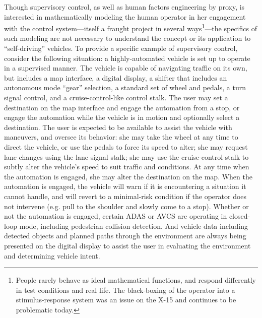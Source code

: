 Though supervisory control, as well as human factors engineering by proxy, is
interested in mathematically modeling the human operator in her
engagement with the control system---itself a fraught project in
several ways\footnote{People rarely behave as ideal mathematical
  functions, and respond differently in test conditions and real life.
  The black-boxing of the operator into a stimulus-response 
system was an issue on the X-15 \cite[p. 54]{DM} and continues to be
problematic today.}---the specifics of such modeling are not necessary to 
understand the concept or its application to ``self-driving'' vehicles. To provide
a specific example of supervisory control, consider the following
situation: a highly-automated vehicle is set up to operate in a
supervised manner. The vehicle is capable of navigating traffic on its
own, but includes a map interface, a digital display, a shifter that includes an
autonomous mode ``gear'' selection, a standard set of wheel and
pedals, a turn signal control,
and a cruise-control-like control stalk. The user may set a
destination on the map interface and engage the automation from a stop, or engage
the automation while the vehicle is in motion and optionally select a
destination. The user is expected to 
be available to assist the vehicle with maneuvers, and oversee its
behavior:  she may take the wheel at any time to direct the vehicle,
or use the pedals to force its speed to alter; she may request lane
changes using the lane signal stalk; she may use the cruise-control
stalk to subtly alter the vehicle's speed to suit traffic and
conditions. At any time when the automation is engaged, she may alter
the destination on the map. When the automation is engaged, the
vehicle will warn if it is encountering a situation it cannot handle,
and will revert to a minimal-risk condition if the operator does not
intervene (e.g. pull to the shoulder and slowly come to a stop).
Whether or not the automation is engaged,
certain ADAS or AVCS are operating in closed-loop mode, including
pedestrian collision detection. And vehicle data including detected
objects and planned paths through the environment are always being
presented on the digital display to assist the user in evaluating the
environment and determining vehicle intent.

